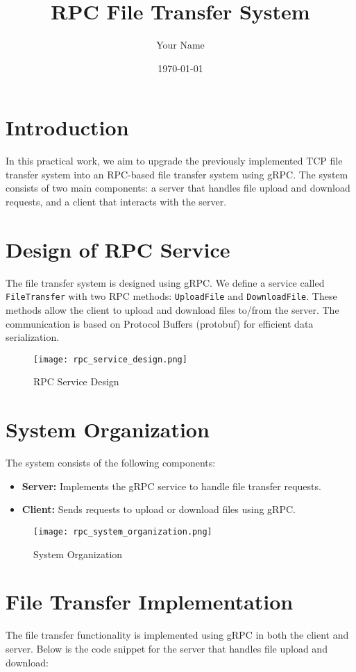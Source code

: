 \documentclass{article}
\title{RPC File Transfer System}
\author{Your Name}
\date{\today}
\begin{document}
\maketitle

\section{Introduction}
In this practical work, we aim to upgrade the previously implemented TCP file transfer system into an RPC-based file transfer system using gRPC. The system consists of two main components: a server that handles file upload and download requests, and a client that interacts with the server.

\section{Design of RPC Service}
The file transfer system is designed using gRPC. We define a service called \texttt{FileTransfer} with two RPC methods: \texttt{UploadFile} and \texttt{DownloadFile}. These methods allow the client to upload and download files to/from the server. The communication is based on Protocol Buffers (protobuf) for efficient data serialization.

\begin{figure}[h!]
\centering
\texttt{[image: rpc\_service\_design.png]}
\caption{RPC Service Design}
\end{figure}

\section{System Organization}
The system consists of the following components:
\begin{itemize}
    \item \textbf{Server:} Implements the gRPC service to handle file transfer requests.
    \item \textbf{Client:} Sends requests to upload or download files using gRPC.
\end{itemize}

\begin{figure}[h!]
\centering
\texttt{[image: rpc\_system\_organization.png]}
\caption{System Organization}
\end{figure}

\section{File Transfer Implementation}
The file transfer functionality is implemented using gRPC in both the client and server. Below is the code snippet for the server that handles file upload and download:
\end{document}
